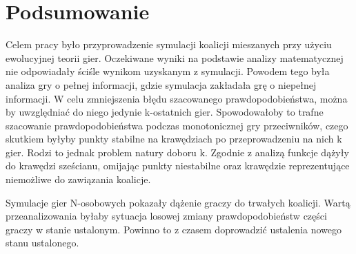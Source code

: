 \chapter{Podsumowanie}
\label{cha:podsumowanie}

Celem pracy było przyprowadzenie symulacji koalicji mieszanych przy użyciu ewolucyjnej teorii gier. Oczekiwane wyniki na podstawie analizy matematycznej nie odpowiadały ściśle wynikom uzyskanym z symulacji. Powodem tego była analiza gry o pełnej informacji, gdzie symulacja zakładała grę o niepełnej informacji. W celu zmniejszenia błędu szacowanego prawdopodobieństwa, można by uwzględniać do niego jedynie k-ostatnich gier. Spowodowałoby to trafne szacowanie prawdopodobieństwa podczas monotonicznej gry przeciwników, czego skutkiem byłyby punkty stabilne na krawędziach po przeprowadzeniu na nich k gier. Rodzi to jednak problem natury doboru k. Zgodnie z analizą funkcje dążyły do krawędzi sześcianu, omijając punkty niestabilne oraz krawędzie reprezentujące niemożliwe do zawiązania koalicje.

Symulacje gier N-osobowych pokazały dążenie graczy do trwałych koalicji. Wartą przeanalizowania byłaby sytuacja losowej zmiany prawdopodobieństw części graczy w stanie ustalonym. Powinno to z czasem doprowadzić ustalenia nowego stanu ustalonego. 
